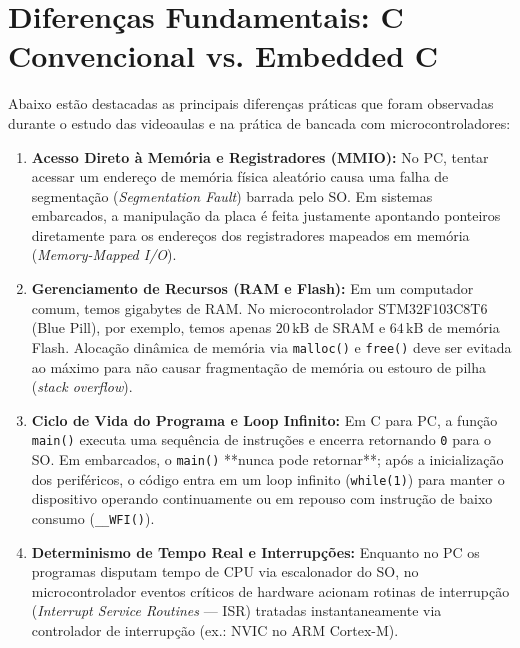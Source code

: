 \documentclass[12pt, a4paper]{article}
\begin{document}
\section{Diferenças Fundamentais: C Convencional vs. Embedded C}
\hspace*{1.25cm}Abaixo estão destacadas as principais diferenças práticas que foram observadas durante o estudo das videoaulas e na prática de bancada com microcontroladores:

\begin{enumerate}
    \item \textbf{Acesso Direto à Memória e Registradores (MMIO):} No PC, tentar acessar um endereço de memória física aleatório causa uma falha de segmentação (\textit{Segmentation Fault}) barrada pelo SO. Em sistemas embarcados, a manipulação da placa é feita justamente apontando ponteiros diretamente para os endereços dos registradores mapeados em memória (\textit{Memory-Mapped I/O}).
    \item \textbf{Gerenciamento de Recursos (RAM e Flash):} Em um computador comum, temos gigabytes de RAM. No microcontrolador STM32F103C8T6 (Blue Pill), por exemplo, temos apenas $20\,\text{kB}$ de SRAM e $64\,\text{kB}$ de memória Flash. Alocação dinâmica de memória via \texttt{malloc()} e \texttt{free()} deve ser evitada ao máximo para não causar fragmentação de memória ou estouro de pilha (\textit{stack overflow}).
    \item \textbf{Ciclo de Vida do Programa e Loop Infinito:} Em C para PC, a função \texttt{main()} executa uma sequência de instruções e encerra retornando \texttt{0} para o SO. Em embarcados, o \texttt{main()} **nunca pode retornar**; após a inicialização dos periféricos, o código entra em um loop infinito (\texttt{while(1)}) para manter o dispositivo operando continuamente ou em repouso com instrução de baixo consumo (\texttt{\_\_WFI()}).
    \item \textbf{Determinismo de Tempo Real e Interrupções:} Enquanto no PC os programas disputam tempo de CPU via escalonador do SO, no microcontrolador eventos críticos de hardware acionam rotinas de interrupção (\textit{Interrupt Service Routines} — ISR) tratadas instantaneamente via controlador de interrupção (ex.: NVIC no ARM Cortex-M).
\end{enumerate}

\end{document}

